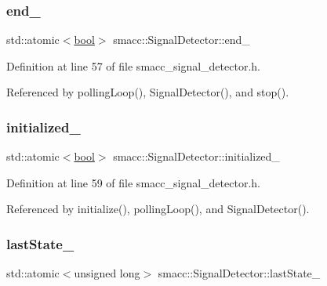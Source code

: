 \subsubsection{\texorpdfstring{end\+\_\+}{end\_}}
{\footnotesize\ttfamily std\+::atomic$<$\hyperlink{classbool}{bool}$>$ smacc\+::\+Signal\+Detector\+::end\+\_\+\hspace{0.3cm}{\ttfamily [private]}}



Definition at line 57 of file smacc\+\_\+signal\+\_\+detector.\+h.



Referenced by polling\+Loop(), Signal\+Detector(), and stop().

\mbox{\label{classsmacc_1_1SignalDetector_a1b3c54963799b538078619906edd5302}} 
\subsubsection{\texorpdfstring{initialized\+\_\+}{initialized\_}}
{\footnotesize\ttfamily std\+::atomic$<$\hyperlink{classbool}{bool}$>$ smacc\+::\+Signal\+Detector\+::initialized\+\_\+\hspace{0.3cm}{\ttfamily [private]}}



Definition at line 59 of file smacc\+\_\+signal\+\_\+detector.\+h.



Referenced by initialize(), polling\+Loop(), and Signal\+Detector().

\mbox{\label{classsmacc_1_1SignalDetector_a72293ed0e98f4200fbe75b53f1e41eab}} 
\subsubsection{\texorpdfstring{last\+State\+\_\+}{lastState\_}}
{\footnotesize\ttfamily std\+::atomic$<$unsigned long$>$ smacc\+::\+Signal\+Detector\+::last\+State\+\_\+\hspace{0.3cm}{\ttfamily [private]}}



